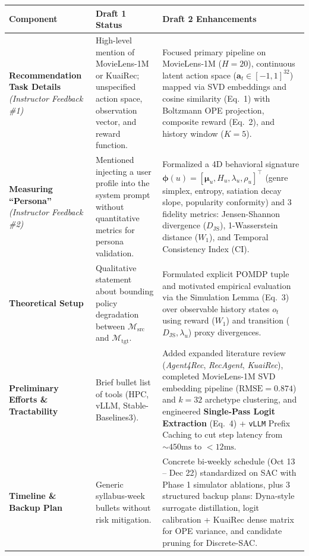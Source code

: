 \documentclass{article}
\begin{document}
\begin{table}[h]
\centering
\label{tab:diff}
\small
\begin{tabular}{@{}p{3.2cm}p{4.5cm}p{5.3cm}@{}}
\toprule
\textbf{Component} & \textbf{Draft 1 Status} & \textbf{Draft 2 Enhancements} \\ \midrule
\textbf{Recommendation Task Details} \newline \textit{(Instructor Feedback \#1)} & High-level mention of MovieLens-1M or KuaiRec; unspecified action space, observation vector, and reward function. & Focused primary pipeline on MovieLens-1M ($H=20$), continuous latent action space ($\bm{a}_t \in [-1,1]^{32}$) mapped via SVD embeddings and cosine similarity (Eq.\ 1) with Boltzmann OPE projection, composite reward (Eq.\ 2), and history window ($K=5$). \\ \addlinespace[4pt]
\textbf{Measuring ``Persona''} \newline \textit{(Instructor Feedback \#2)} & Mentioned injecting a user profile into the system prompt without quantitative metrics for persona validation. & Formalized a 4D behavioral signature $\bm{\phi}(u) = [\bm{\mu}_u, H_u, \lambda_u, \rho_u]^\top$ (genre simplex, entropy, satiation decay slope, popularity conformity) and 3 fidelity metrics: Jensen-Shannon divergence ($D_{\text{JS}}$), 1-Wasserstein distance ($W_1$), and Temporal Consistency Index ($\text{CI}$). \\ \addlinespace[4pt]
\textbf{Theoretical Setup} & Qualitative statement about bounding policy degradation between $\mathcal{M}_{\text{src}}$ and $\mathcal{M}_{\text{tgt}}$. & Formulated explicit POMDP tuple and motivated empirical evaluation via the Simulation Lemma (Eq.\ 3) over observable history states $o_t$ using reward ($W_1$) and transition ($D_{\text{JS}}, \lambda_u$) proxy divergences. \\ \addlinespace[4pt]
\textbf{Preliminary Efforts \& Tractability} & Brief bullet list of tools (HPC, vLLM, Stable-Baselines3). & Added expanded literature review (\textit{Agent4Rec}, \textit{RecAgent}, \textit{KuaiRec}), completed MovieLens-1M SVD embedding pipeline ($\text{RMSE}=0.874$) and $k=32$ archetype clustering, and engineered \textbf{Single-Pass Logit Extraction} (Eq.\ 4) + \texttt{vLLM} Prefix Caching to cut step latency from $\sim 450\text{ms}$ to $<12\text{ms}$. \\ \addlinespace[4pt]
\textbf{Timeline \& Backup Plan} & Generic syllabus-week bullets without risk mitigation. & Concrete bi-weekly schedule (Oct 13 -- Dec 22) standardized on SAC with Phase 1 simulator ablations, plus 3 structured backup plans: Dyna-style surrogate distillation, logit calibration + KuaiRec dense matrix for OPE variance, and candidate pruning for Discrete-SAC. \\ \bottomrule
\end{tabular}
\end{table}
\end{document}
